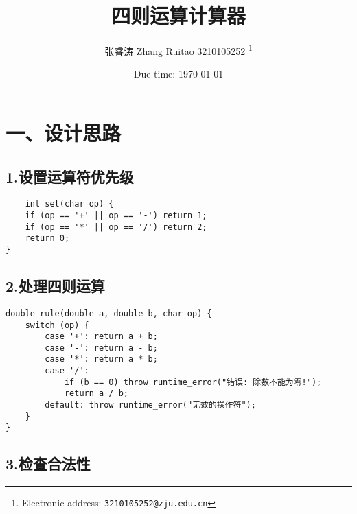 \documentclass[a4paper]{article}
\begin{document}
\title{四则运算计算器}

\author{张睿涛 Zhang Ruitao 3210105252
  \thanks{Electronic address: \texttt{3210105252@zju.edu.cn}}}

\date{Due time: \today}
\maketitle
\section*{一、设计思路}
\subsection*{1.设置运算符优先级}
\begin{lstlisting}
    int set(char op) {
    if (op == '+' || op == '-') return 1;
    if (op == '*' || op == '/') return 2;
    return 0;
}
\end{lstlisting}
\subsection*{2.处理四则运算}
\begin{lstlisting}
double rule(double a, double b, char op) {
    switch (op) {
        case '+': return a + b;
        case '-': return a - b;
        case '*': return a * b;
        case '/': 
            if (b == 0) throw runtime_error("错误: 除数不能为零!");
            return a / b;
        default: throw runtime_error("无效的操作符");
    }
}
\end{lstlisting}
\subsection*{3.检查合法性}
\end{document}
